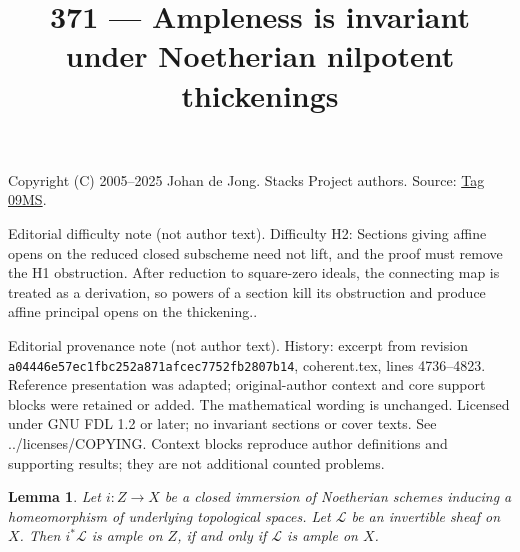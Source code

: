 \documentclass{amsart}
\theoremstyle{plain}
\newtheorem{lemma}[subsection]{Lemma}
\theoremstyle{definition}
\theoremstyle{remark}
\numberwithin{equation}{subsection}
\begin{document}
\title[Stacks Project, Tag 09MS]{371 --- Ampleness is invariant under Noetherian nilpotent thickenings}
\maketitle
\noindent Copyright (C) 2005--2025 Johan de Jong. Stacks Project authors. Source: \href{https://stacks.math.columbia.edu/tag/09MS}{Tag 09MS}.

\noindent Editorial difficulty note (not author text). Difficulty H2: Sections giving affine opens on the reduced closed subscheme need not lift, and the proof must remove the H1 obstruction. After reduction to square-zero ideals, the connecting map is treated as a derivation, so powers of a section kill its obstruction and produce affine principal opens on the thickening..

\noindent Editorial provenance note (not author text). History: excerpt from revision \texttt{a0444\allowbreak 6e57e\allowbreak c1fbc\allowbreak 252a8\allowbreak 71afc\allowbreak ec775\allowbreak 2fb28\allowbreak 07b14}, coherent.tex, lines 4736--4823. Reference presentation was adapted; original-author context and core support blocks were retained or added. The mathematical wording is unchanged. Licensed under GNU FDL 1.2 or later; no invariant sections or cover texts. See ../licenses/COPYING. Context blocks reproduce author definitions and supporting results; they are not additional counted problems.

\begin{lemma}
\label{lemma-ample-on-reduction}
Let $i : Z \to X$ be a closed immersion of Noetherian schemes
inducing a homeomorphism of underlying topological spaces.
Let $\mathcal{L}$ be an invertible sheaf on $X$.
Then $i^*\mathcal{L}$ is ample on $Z$, if and only if
$\mathcal{L}$ is ample on $X$.
\end{lemma}
\end{document}
